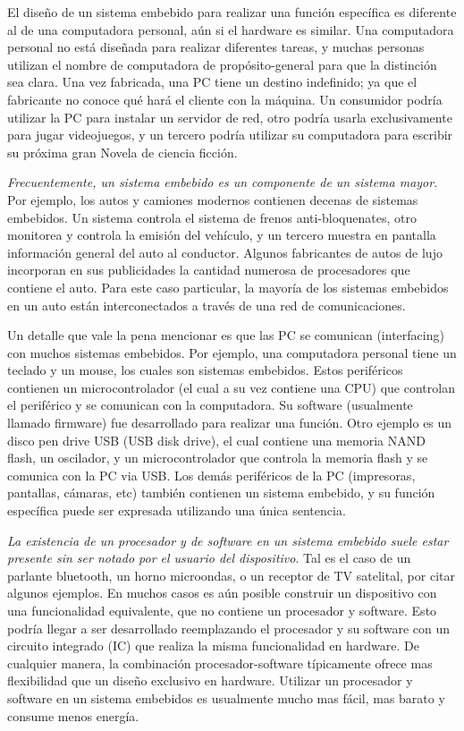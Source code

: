 \documentclass[output=paper, 
colorlinks,
citecolor=brown,
newtxmath
]{langscibook}
\begin{document}
El diseño de un sistema embebido para realizar una función específica es diferente al de una
computadora personal, aún si el hardware es similar. Una computadora personal no está diseñada
para realizar diferentes tareas, y muchas personas utilizan el nombre de computadora de propósito-general
para que la distinción sea clara. Una vez fabricada, una PC tiene un destino indefinido; 
ya que el fabricante no conoce qué hará el cliente con la máquina. Un consumidor podría utilizar
la PC para instalar un servidor de red, otro podría usarla exclusivamente para jugar videojuegos,
y un tercero podría utilizar su computadora para escribir su próxima gran Novela de ciencia ficción.


\textit{Frecuentemente, un sistema embebido es un componente de un sistema mayor}. Por ejemplo, 
los autos y camiones modernos contienen decenas de sistemas embebidos. Un sistema controla el sistema de frenos anti-bloquenates, otro monitorea y controla la emisión del vehículo, 
y un tercero muestra en pantalla información general del auto al conductor.  Algunos fabricantes de
autos de lujo incorporan en sus publicidades la cantidad numerosa de procesadores que contiene
el auto. Para este caso particular, la mayoría de los sistemas embebidos en un auto
están interconectados a través de una red de comunicaciones.



Un detalle que vale la pena mencionar es que las PC se comunican (interfacing) con 
muchos sistemas embebidos. Por ejemplo, una computadora personal tiene un teclado y un mouse,
los cuales son sistemas embebidos. Estos periféricos contienen un microcontrolador (el cual
a su vez contiene una CPU) que controlan el periférico y se comunican con la computadora.
Su software (usualmente llamado firmware) fue desarrollado para realizar una función.
Otro ejemplo es un disco pen drive USB (USB disk drive), el cual contiene una memoria NAND flash,
un oscilador, y un microcontrolador que controla la memoria flash y se comunica con la PC
via USB. Los demás periféricos de la PC (impresoras, pantallas, cámaras, etc) también
contienen un sistema embebido, y su función específica puede ser expresada utilizando
una única sentencia.

\textit{La existencia de un procesador y de software en un sistema embebido suele estar presente sin
ser notado por el usuario del dispositivo}. Tal es el caso de un parlante bluetooth, un horno microondas,
o un receptor de TV satelital, por citar algunos ejemplos. En muchos casos es aún posible construir
un dispositivo con una funcionalidad equivalente, que no contiene un procesador y software. 
Esto podría llegar a ser desarrollado reemplazando el procesador y su software con un circuito integrado
(IC) que realiza la misma funcionalidad en hardware. De cualquier manera, la combinación
procesador-software típicamente ofrece mas flexibilidad que un diseño exclusivo en hardware. 
Utilizar un procesador y software en un sistema embebidos es usualmente mucho mas fácil, mas barato y 
consume menos energía.
\end{document}
